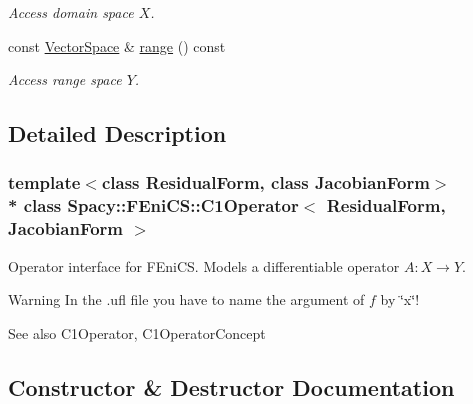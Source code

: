 \begin{DoxyCompactItemize}
\begin{DoxyCompactList}\small\item\em Access domain space $X$. \end{DoxyCompactList}\item 
const \hyperlink{classSpacy_1_1VectorSpace}{Vector\+Space} \& \hyperlink{classSpacy_1_1OperatorBase_ab19d3b7a6f290b1079248f1e567e53d6}{range} () const \hypertarget{classSpacy_1_1OperatorBase_ab19d3b7a6f290b1079248f1e567e53d6}{}\label{classSpacy_1_1OperatorBase_ab19d3b7a6f290b1079248f1e567e53d6}

\begin{DoxyCompactList}\small\item\em Access range space $Y$. \end{DoxyCompactList}\end{DoxyCompactItemize}


\subsection{Detailed Description}
\subsubsection*{template$<$class Residual\+Form, class Jacobian\+Form$>$\\*
class Spacy\+::\+F\+Eni\+C\+S\+::\+C1\+Operator$<$ Residual\+Form, Jacobian\+Form $>$}

Operator interface for F\+Eni\+CS. Models a differentiable operator $A:X\rightarrow Y$. 

\begin{DoxyWarning}{Warning}
In the .ufl file you have to name the argument of $f$ by \char`\"{}x\char`\"{}! 
\end{DoxyWarning}
\begin{DoxySeeAlso}{See also}
C1\+Operator, C1\+Operator\+Concept 
\end{DoxySeeAlso}


\subsection{Constructor \& Destructor Documentation}
